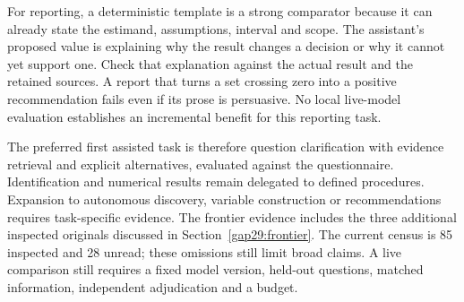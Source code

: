 For reporting, a deterministic template is a strong comparator because
it can already state the estimand, assumptions, interval and scope.
The assistant's proposed value is explaining why the result changes a
decision or why it cannot yet support one. Check that explanation
against the actual result and the retained sources. A report that turns
a set crossing zero into a positive recommendation fails even if its
prose is persuasive. No local live-model evaluation establishes an
incremental benefit for this reporting task.

The preferred first assisted task is therefore question clarification
with evidence retrieval and explicit alternatives, evaluated against
the questionnaire. Identification and numerical results remain delegated
to defined procedures. Expansion to autonomous discovery, variable
construction or recommendations requires task-specific evidence. The
frontier evidence includes the three additional inspected originals discussed
in Section~\ref{gap29:frontier}. The current census is 85 inspected and
28 unread; these omissions still limit broad claims. A live comparison still
requires a fixed model version, held-out questions, matched information,
independent adjudication and a budget.


